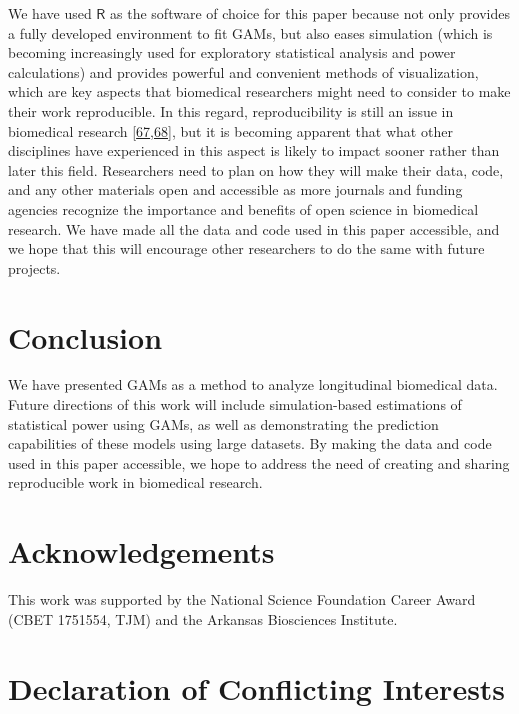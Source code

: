 \documentclass[
]{article}
\begin{document}
We have used \(\textsf{R}\) as the software of choice for this paper because not only provides a fully developed environment to fit GAMs, but also eases simulation (which is becoming increasingly used for exploratory statistical analysis and power calculations) and provides powerful and convenient methods of visualization, which are key aspects that biomedical researchers might need to consider to make their work reproducible. In this regard, reproducibility is still an issue in biomedical research {[}\protect\hyperlink{ref-begley2015}{67},\protect\hyperlink{ref-weissgerber2018}{68}{]}, but it is becoming apparent that what other disciplines have experienced in this aspect is likely to impact sooner rather than later this field. Researchers need to plan on how they will make their data, code, and any other materials open and accessible as more journals and funding agencies recognize the importance and benefits of open science in biomedical research. We have made all the data and code used in this paper accessible, and we hope that this will encourage other researchers to do the same with future projects.

\hypertarget{conclusion}{%
\section{Conclusion}\label{conclusion}}

We have presented GAMs as a method to analyze longitudinal biomedical data. Future directions of this work will include simulation-based estimations of statistical power using GAMs, as well as demonstrating the prediction capabilities of these models using large datasets.
By making the data and code used in this paper accessible, we hope to address the need of creating and sharing reproducible work in biomedical research.

\hypertarget{acknowledgements}{%
\section{Acknowledgements}\label{acknowledgements}}

This work was supported by the National Science Foundation Career Award (CBET 1751554, TJM) and the Arkansas Biosciences Institute.

\hypertarget{declaration-of-conflicting-interests}{%
\section{Declaration of Conflicting Interests}\label{declaration-of-conflicting-interests}}
\end{document}
